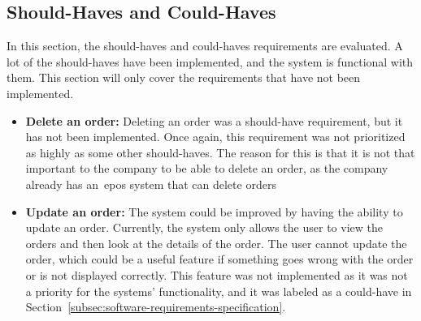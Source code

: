 \subsection{Should-Haves and Could-Haves}\label{subsec:should-haves-and-could-haves}

In this section, the should-haves and could-haves requirements are evaluated.
A lot of the should-haves have been implemented, and the system is functional with them.
This section will only cover the requirements that have not been implemented.

\begin{itemize}
    \item \textbf{Delete an order:}
    Deleting an order was a should-have requirement, but it has not been implemented.
    Once again, this requirement was not prioritized as highly as some other should-haves.
    The reason for this is that it is not that important to the company to be able to delete an order, as the company
    already has an~\acrshort{epos} system that can delete orders

    \item \textbf{Update an order:}
    The system could be improved by having the ability to update an order.
    Currently, the system only allows the user to view the orders and then look at the details of the order.
    The user cannot update the order, which could be a useful feature if something goes wrong with the order or is not
    displayed correctly.
    This feature was not implemented as it was not a priority for the systems' functionality, and it was labeled as a
    could-have in Section~\ref{subsec:software-requirements-specification}.
\end{itemize}
